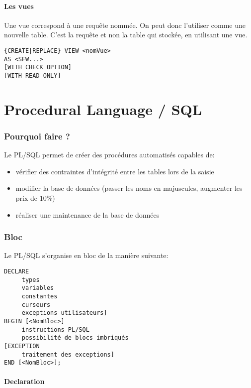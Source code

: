 \documentclass[10pt,a4paper,twoside]{article}
\begin{document}
\subsection{Les vues}
Une vue correspond à une requête nommée. On peut donc l'utiliser comme une nouvelle table. C'est la requête et non la table qui stockée, en utilisant une vue.

\begin{verbatim}
{CREATE|REPLACE} VIEW <nomVue>
AS <SFW...>
[WITH CHECK OPTION]
[WITH READ ONLY]
\end{verbatim}

\newpage
\part{Procedural Language / SQL}
\section{Pourquoi faire ?}
Le PL/SQL permet de créer des procédures automatisés capables de:
\begin{itemize}
\item vérifier des contraintes d'intégrité entre les tables lors de la saisie
\item modifier la base de données (passer les noms en majuscules, augmenter les prix de 10\%)
\item réaliser une maintenance de la base de données
\end{itemize}


\section{Bloc}
Le PL/SQL s'organise en bloc de la manière suivante:
\begin{verbatim}
DECLARE
     types
     variables
     constantes
     curseurs
     exceptions utilisateurs]
BEGIN [<NomBloc>]
     instructions PL/SQL
     possibilité de blocs imbriqués
[EXCEPTION
     traitement des exceptions]
END [<NomBloc>];
\end{verbatim}

\subsection{Declaration}
\end{document}
